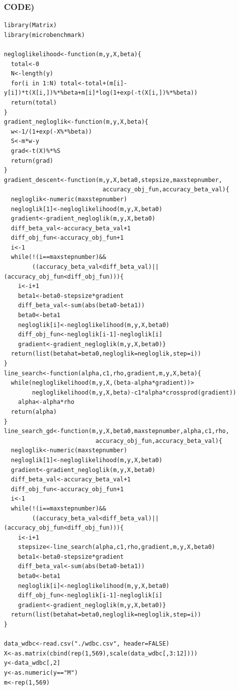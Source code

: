 \documentclass{article}
\begin{document}
\newpage

\subsubsection*{CODE)}

\begin{lstlisting}[basicstyle=\small]
library(Matrix)
library(microbenchmark)

negloglikelihood<-function(m,y,X,beta){
  total<-0
  N<-length(y)
  for(i in 1:N) total<-total+(m[i]-y[i])*t(X[i,])%*%beta+m[i]*log(1+exp(-t(X[i,])%*%beta))
  return(total)
}
gradient_negloglik<-function(m,y,X,beta){
  w<-1/(1+exp(-X%*%beta))
  S<-m*w-y
  grad<-t(X)%*%S
  return(grad)
}
gradient_descent<-function(m,y,X,beta0,stepsize,maxstepnumber,
							accuracy_obj_fun,accuracy_beta_val){
  negloglik<-numeric(maxstepnumber)
  negloglik[1]<-negloglikelihood(m,y,X,beta0)
  gradient<-gradient_negloglik(m,y,X,beta0)
  diff_beta_val<-accuracy_beta_val+1
  diff_obj_fun<-accuracy_obj_fun+1
  i<-1
  while(!(i==maxstepnumber)&&
  	    ((accuracy_beta_val<diff_beta_val)||(accuracy_obj_fun<diff_obj_fun))){
    i<-i+1
    beta1<-beta0-stepsize*gradient
    diff_beta_val<-sum(abs(beta0-beta1))
    beta0<-beta1
    negloglik[i]<-negloglikelihood(m,y,X,beta0)
    diff_obj_fun<-negloglik[i-1]-negloglik[i]
    gradient<-gradient_negloglik(m,y,X,beta0)}
  return(list(betahat=beta0,negloglik=negloglik,step=i))
}
line_search<-function(alpha,c1,rho,gradient,m,y,X,beta){
  while(negloglikelihood(m,y,X,(beta-alpha*gradient))>
        negloglikelihood(m,y,X,beta)-c1*alpha*crossprod(gradient))
    alpha<-alpha*rho
  return(alpha)
}
line_search_gd<-function(m,y,X,beta0,maxstepnumber,alpha,c1,rho,
						  accuracy_obj_fun,accuracy_beta_val){
  negloglik<-numeric(maxstepnumber)
  negloglik[1]<-negloglikelihood(m,y,X,beta0)
  gradient<-gradient_negloglik(m,y,X,beta0)
  diff_beta_val<-accuracy_beta_val+1
  diff_obj_fun<-accuracy_obj_fun+1
  i<-1
  while(!(i==maxstepnumber)&&
  	    ((accuracy_beta_val<diff_beta_val)||(accuracy_obj_fun<diff_obj_fun))){
    i<-i+1
    stepsize<-line_search(alpha,c1,rho,gradient,m,y,X,beta0)
    beta1<-beta0-stepsize*gradient
    diff_beta_val<-sum(abs(beta0-beta1))
    beta0<-beta1
    negloglik[i]<-negloglikelihood(m,y,X,beta0)
    diff_obj_fun<-negloglik[i-1]-negloglik[i]
    gradient<-gradient_negloglik(m,y,X,beta0)}
  return(list(betahat=beta0,negloglik=negloglik,step=i))
}

data_wdbc<-read.csv("./wdbc.csv", header=FALSE)
X<-as.matrix(cbind(rep(1,569),scale(data_wdbc[,3:12])))
y<-data_wdbc[,2]
y<-as.numeric(y=="M")
m<-rep(1,569)


\end{lstlisting}
\end{document}
